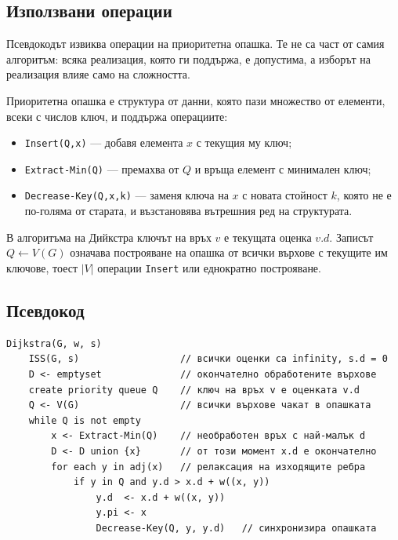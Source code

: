 \subsection{Използвани операции}\label{s:8.3.2}

Псевдокодът извиква операции на приоритетна опашка. Те не са част от самия алгоритъм: всяка реализация, която ги поддържа, е допустима, а изборът на реализация влияе само на сложността.

\begin{defn}
Приоритетна опашка е структура от данни, която пази множество от елементи, всеки с числов ключ, и поддържа операциите:

\begin{itemize}
\item \verb|Insert(Q,x)| --- добавя елемента $x$ с текущия му ключ;
\item \verb|Extract-Min(Q)| --- премахва от $Q$ и връща елемент с минимален ключ;
\item \verb|Decrease-Key(Q,x,k)| --- заменя ключа на $x$ с новата стойност $k$, която не е по-голяма от старата, и възстановява вътрешния ред на структурата.
\end{itemize}
\end{defn}

В алгоритъма на Дийкстра ключът на връх $v$ е текущата оценка $v.d$. Записът $Q\leftarrow V(G)$ означава построяване на опашка от всички върхове с текущите им ключове, тоест $|V|$ операции \verb|Insert| или еднократно построяване.

\subsection{Псевдокод}\label{s:8.3.3}

\begin{verbatim}
Dijkstra(G, w, s)
    ISS(G, s)                  // всички оценки са infinity, s.d = 0
    D <- emptyset              // окончателно обработените върхове
    create priority queue Q    // ключ на връх v е оценката v.d
    Q <- V(G)                  // всички върхове чакат в опашката
    while Q is not empty
        x <- Extract-Min(Q)    // необработен връх с най-малък d
        D <- D union {x}       // от този момент x.d е окончателно
        for each y in adj(x)   // релаксация на изходящите ребра
            if y in Q and y.d > x.d + w((x, y))
                y.d  <- x.d + w((x, y))
                y.pi <- x
                Decrease-Key(Q, y, y.d)   // синхронизира опашката
\end{verbatim}

